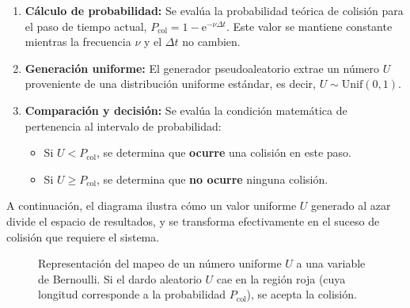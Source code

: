 \documentclass[11pt]{article}
\begin{document}
\begin{enumerate}
    \item \textbf{Cálculo de probabilidad:} Se evalúa la probabilidad teórica de colisión para el paso de tiempo actual, $P_{\mathrm{col}} = 1 - \mathrm{e}^{-\nu\Delta t}$. Este valor se mantiene constante mientras la frecuencia $\nu$ y el $\Delta t$ no cambien.
    \item \textbf{Generación uniforme:} El generador pseudoaleatorio extrae un número $U$ proveniente de una distribución uniforme estándar, es decir, $U \sim \mathrm{Unif}(0, 1)$.
    \item \textbf{Comparación y decisión:} Se evalúa la condición matemática de pertenencia al intervalo de probabilidad:
    \begin{itemize}
        \item Si $U < P_{\mathrm{col}}$, se determina que \textbf{ocurre} una colisión en este paso.
        \item Si $U \ge P_{\mathrm{col}}$, se determina que \textbf{no ocurre} ninguna colisión.
    \end{itemize}
\end{enumerate}

A continuación, el diagrama ilustra cómo un valor uniforme $U$ generado al azar divide el espacio de resultados, y se transforma efectivamente en el suceso de colisión que requiere el sistema.

\begin{figure}[H]
    \centering
    \caption{Representación del mapeo de un número uniforme $U$ a una variable de Bernoulli. Si el dardo aleatorio $U$ cae en la región roja (cuya longitud corresponde a la probabilidad $P_{\mathrm{col}}$), se acepta la colisión.}
\end{figure}
\end{document}
